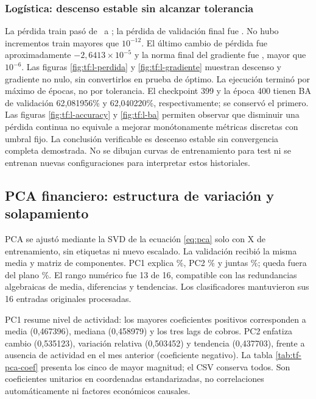 \subsubsection{Logística: descenso estable sin alcanzar tolerancia}
La pérdida train pasó de \TFLInicial\ a \TFLFinal; la pérdida de validación final fue \TFLValFinal. No hubo incrementos train mayores que $10^{-12}$. El último cambio de pérdida fue aproximadamente $-2,6413\times10^{-5}$ y la norma final del gradiente fue \TFGradFinal, mayor que $10^{-6}$. Las figuras \ref{fig:tf:l-perdida} y \ref{fig:tf:l-gradiente} muestran descenso y gradiente no nulo, sin convertirlos en prueba de óptimo.
La ejecución terminó por máximo de épocas, no por tolerancia. El checkpoint 399 y la época 400 tienen BA de validación 62,081956\% y 62,040220\%, respectivamente; se conservó el primero. Las figuras \ref{fig:tf:l-accuracy} y \ref{fig:tf:l-ba} permiten observar que disminuir una pérdida continua no equivale a mejorar monótonamente métricas discretas con umbral fijo.
La conclusión verificable es descenso estable sin convergencia completa demostrada. No se dibujan curvas de entrenamiento para test ni se entrenan nuevas configuraciones para interpretar estos historiales.

\clearpage
\subsection{PCA financiero: estructura de variación y solapamiento}
PCA se ajustó mediante la SVD de la ecuación \ref{eq:pca} solo con X de entrenamiento, sin etiquetas ni nuevo escalado. La validación recibió la misma media y matriz de componentes. PC1 explica \TFPCAUno\%, PC2 \TFPCADos\% y juntas \TFPCARetenida\%; queda fuera del plano \TFPCAPerdida\%. El rango numérico fue 13 de 16, compatible con las redundancias algebraicas de media, diferencias y tendencias. Los clasificadores mantuvieron sus 16 entradas originales procesadas.

PC1 resume nivel de actividad: los mayores coeficientes positivos corresponden a media (0,467396), mediana (0,458979) y los tres lags de cobros. PC2 enfatiza cambio (0,535123), variación relativa (0,503452) y tendencia (0,437703), frente a ausencia de actividad en el mes anterior (coeficiente negativo). La tabla \ref{tab:tf-pca-coef} presenta los cinco de mayor magnitud; el CSV conserva todos. Son coeficientes unitarios en coordenadas estandarizadas, no correlaciones automáticamente ni factores económicos causales.

